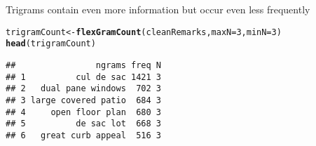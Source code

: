 \documentclass{article}\usepackage[]{graphicx}\usepackage[]{color}
\makeatletter
\newcommand{\hlnum}[1]{\textcolor[rgb]{0.686,0.059,0.569}{#1}}%
\newcommand{\hlstd}[1]{\textcolor[rgb]{0.345,0.345,0.345}{#1}}%
\newcommand{\hlkwb}[1]{\textcolor[rgb]{0.69,0.353,0.396}{#1}}%
\newcommand{\hlkwc}[1]{\textcolor[rgb]{0.333,0.667,0.333}{#1}}%
\newcommand{\hlkwd}[1]{\textcolor[rgb]{0.737,0.353,0.396}{\textbf{#1}}}%
\newenvironment{kframe}{%
 \def\at@end@of@kframe{}%
 \ifinner\ifhmode%
  \def\at@end@of@kframe{\end{minipage}}%
  \begin{minipage}{\columnwidth}%
 \fi\fi%
 \def\FrameCommand##1{\hskip\@totalleftmargin \hskip-\fboxsep
 \colorbox{shadecolor}{##1}\hskip-\fboxsep
     \hskip-\linewidth \hskip-\@totalleftmargin \hskip\columnwidth}%
 \MakeFramed {\advance\hsize-\width
   \@totalleftmargin\z@ \linewidth\hsize
   \@setminipage}}%
 {\par\unskip\endMakeFramed%
 \at@end@of@kframe}
\newenvironment{knitrout}{}{} %
\makeatother
\begin{document}
\noindent Trigrams contain even more information but occur even less frequently
\begin{knitrout}\footnotesize
{}\color{fgcolor}\begin{kframe}
\begin{alltt}
\hlstd{trigramCount} \hlkwb{<-} \hlkwd{flexGramCount}\hlstd{(cleanRemarks ,} \hlkwc{maxN}\hlstd{=}\hlnum{3} \hlstd{,} \hlkwc{minN}\hlstd{=}\hlnum{3}\hlstd{)}
\hlkwd{head}\hlstd{(trigramCount)}
\end{alltt}
\begin{verbatim}
##                ngrams freq N
## 1          cul de sac 1421 3
## 2   dual pane windows  702 3
## 3 large covered patio  684 3
## 4     open floor plan  680 3
## 5          de sac lot  668 3
## 6   great curb appeal  516 3
\end{verbatim}
\end{kframe}
\end{knitrout}
\end{document}
